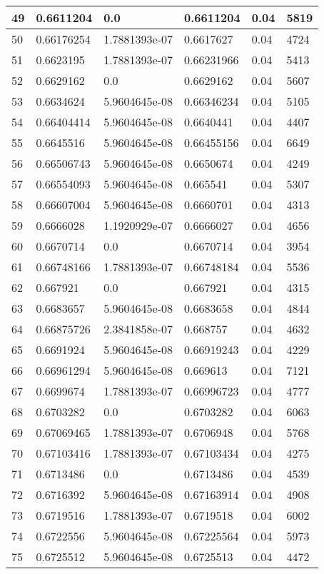 \begin{longtable}{|l|l|l|l|l|l|}
49 & 0.6611204 & 0.0 & 0.6611204 & 0.04 & 5819 \\ \hline 
50 & 0.66176254 & 1.7881393e-07 & 0.6617627 & 0.04 & 4724 \\ \hline 
51 & 0.6623195 & 1.7881393e-07 & 0.66231966 & 0.04 & 5413 \\ \hline 
52 & 0.6629162 & 0.0 & 0.6629162 & 0.04 & 5607 \\ \hline 
53 & 0.6634624 & 5.9604645e-08 & 0.66346234 & 0.04 & 5105 \\ \hline 
54 & 0.66404414 & 5.9604645e-08 & 0.6640441 & 0.04 & 4407 \\ \hline 
55 & 0.6645516 & 5.9604645e-08 & 0.66455156 & 0.04 & 6649 \\ \hline 
56 & 0.66506743 & 5.9604645e-08 & 0.6650674 & 0.04 & 4249 \\ \hline 
57 & 0.66554093 & 5.9604645e-08 & 0.665541 & 0.04 & 5307 \\ \hline 
58 & 0.66607004 & 5.9604645e-08 & 0.6660701 & 0.04 & 4313 \\ \hline 
59 & 0.6666028 & 1.1920929e-07 & 0.6666027 & 0.04 & 4656 \\ \hline 
60 & 0.6670714 & 0.0 & 0.6670714 & 0.04 & 3954 \\ \hline 
61 & 0.66748166 & 1.7881393e-07 & 0.66748184 & 0.04 & 5536 \\ \hline 
62 & 0.667921 & 0.0 & 0.667921 & 0.04 & 4315 \\ \hline 
63 & 0.6683657 & 5.9604645e-08 & 0.6683658 & 0.04 & 4844 \\ \hline 
64 & 0.66875726 & 2.3841858e-07 & 0.668757 & 0.04 & 4632 \\ \hline 
65 & 0.6691924 & 5.9604645e-08 & 0.66919243 & 0.04 & 4229 \\ \hline 
66 & 0.66961294 & 5.9604645e-08 & 0.669613 & 0.04 & 7121 \\ \hline 
67 & 0.6699674 & 1.7881393e-07 & 0.66996723 & 0.04 & 4777 \\ \hline 
68 & 0.6703282 & 0.0 & 0.6703282 & 0.04 & 6063 \\ \hline 
69 & 0.67069465 & 1.7881393e-07 & 0.6706948 & 0.04 & 5768 \\ \hline 
70 & 0.67103416 & 1.7881393e-07 & 0.67103434 & 0.04 & 4275 \\ \hline 
71 & 0.6713486 & 0.0 & 0.6713486 & 0.04 & 4539 \\ \hline 
72 & 0.6716392 & 5.9604645e-08 & 0.67163914 & 0.04 & 4908 \\ \hline 
73 & 0.6719516 & 1.7881393e-07 & 0.6719518 & 0.04 & 6002 \\ \hline 
74 & 0.6722556 & 5.9604645e-08 & 0.67225564 & 0.04 & 5973 \\ \hline 
75 & 0.6725512 & 5.9604645e-08 & 0.6725513 & 0.04 & 4472 \\ \hline 
\end{longtable}